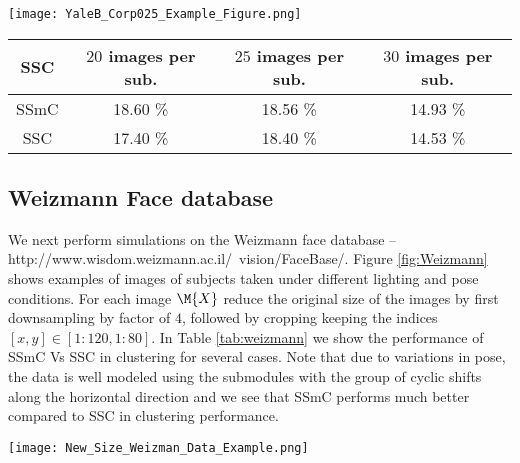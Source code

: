\documentclass[conference]{IEEEtran}
\begin{document}
\begin{figure*}	
\centering
 	\texttt{[image: YaleB\_Corp025\_Example\_Figure.png]}
 	\caption{Examples of faces from 3 subjects from the Cropped YaleB data set taken under different lighting conditions. Note that centering and alignment is done on the images to focus mainly on the face and there is no pose variation.}
	\label{fig:YaleBCrop}
	\end{figure*}   

\begin{table*}
\begin{center}
\begin{tabular}{ |c|c| c|c| }
\hline
 SSC & $20$ images per sub. & $25$ images per sub. & $30$ images per sub. \\
 \hline 
 SSmC & 18.60 \% & 18.56 \% & 14.93 \% \\  
 \hline
 SSC & 17.40 \% & 18.40 \% & 14.53 \% \\
 \hline
\end{tabular}
\vspace{2mm}
\caption{Error in clustering for the SSC and SSmC methods for the YaleBCrop data \cite{Elhamifar:2012uz}. The number of subjects is $5$. The errors are averaged over $5$ instances of randomly selecting the indicated number of images per subject.}
\label{tab:yale}
\end{center} 
\end{table*}



\subsection{Weizmann Face database}
We next perform simulations on the Weizmann face database -- http://www.wisdom.weizmann.ac.il/~vision/FaceBase/. Figure \ref{fig:Weizmann} shows examples of images of subjects taken under different lighting and pose conditions. For each image $\M{X}$ reduce the original size of the images by first downsampling by factor of $4$, followed by cropping keeping the indices $[x,y] \in [ 1:120, 1:80]$. In Table \ref{tab:weizmann} we show the performance of SSmC Vs SSC in clustering for several cases. Note that due to variations in pose, the data is well modeled using the submodules with the group of cyclic shifts along the horizontal direction and we see that SSmC performs much better compared to SSC in clustering performance. 

\begin{figure*}	
\centering
 	\texttt{[image: New\_Size\_Weizman\_Data\_Example.png]}
 	\caption{\label{fig:Weizmann} Examples of faces from 3 subjects from the Weizmann data set taken under different lighting and pose conditions. In this database, the minor variations in the pose can be approximately captured by shifts along the horizontal direction.}
	\end{figure*}   
\end{document}
